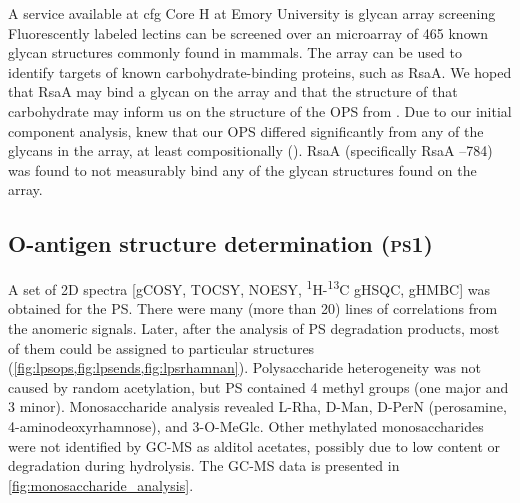         A service available at \ac{cfg} Core H at Emory University is glycan array screening Fluorescently labeled lectins can be screened over an microarray of 465 known glycan structures commonly found in mammals. The array can be used to identify targets of known carbohydrate-binding proteins, such as RsaA. We hoped that RsaA may bind a glycan on the array and that the structure of that carbohydrate may inform us on the structure of the \ac{OPS} from \caulobacter. Due to our initial component analysis, knew that our \ac{OPS} differed significantly from any of the glycans in the array, at least compositionally (). RsaA (specifically RsaA --784) was found to not measurably bind any of the glycan structures found on the array. 

        \subsection{O-antigen structure determination (\textsc{ps}1)} %
        \label{sub:o_antigen_structure_determination_ps1_}

        A set of 2D spectra [\ac{gCOSY}, \ac{TOCSY}, \ac{NOESY},
        \textsuperscript{1}H-\textsuperscript{13}C \ac{gHSQC}, \ac{gHMBC}] was obtained for the
        \ac{PS}. There were many (more than 20) lines of correlations from the anomeric signals. Later,
        after the analysis of \ac{PS} degradation products, most of them could be assigned to particular
        structures (\cref{fig:lpsops,fig:lpsends,fig:lpsrhamnan}). Polysaccharide heterogeneity was not
        caused by random acetylation, but \ac{PS} contained 4 methyl groups (one major and 3
        minor). Monosaccharide analysis revealed L-Rha, D-Man, D-PerN (perosamine, 4-aminodeoxyrhamnose),
        and 3-O-MeGlc. Other methylated monosaccharides were not identified by \ac{GC-MS} as alditol
        acetates, possibly due to low content or degradation during hydrolysis. The \ac{GC-MS} data is
        presented in \cref{fig:monosaccharide_analysis}.

